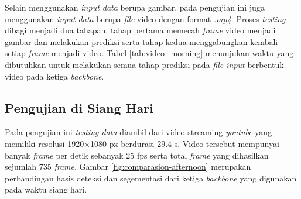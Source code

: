 \begin{table}[!h]
\begin{minipage}[b]{\textwidth}
\begin{tabular}{|l|c|c|c|}
		\end{tabular}
	\end{minipage}
	\label{tab:evaluate-morning}
\end{table}

Selain menggunakan \textit{input data} berupa gambar, pada pengujian ini juga menggunakan \textit{input data} berupa \textit{file} video dengan format \textit{.mp4}. Proses \textit{testing} dibagi menjadi dua tahapan, tahap pertama memecah \textit{frame} video menjadi gambar dan melakukan prediksi serta tahap kedua menggabungkan kembali setiap \textit{frame} menjadi video. Tabel \ref{tab:video_morning} menunjukan waktu yang dibutuhkan untuk melakukan semua tahap prediksi pada \textit{file input} berbentuk video pada ketiga \textit{backbone}.

\begin{table}[!h]
	\label{tab:video_morning}
\end{table}

\subsection{Pengujian di Siang Hari}
\label{subsec:siang}

Pada pengujian ini \textit{testing data} diambil dari video streaming \textit{youtube}\citep{test-siang} yang memiliki resolusi 1920$\times$1080 px berdurasi 29.4 s. Video tersebut mempunyai banyak \textit{frame} per detik sebanyak 25 fps serta total \textit{frame} yang dihasilkan sejumlah 735 \textit{frame}. Gambar \ref{fig:comparasion-afternoon} merupakan perbandingan hasis deteksi dan segementasi dari ketiga \textit{backbone} yang digunakan pada waktu siang hari.

